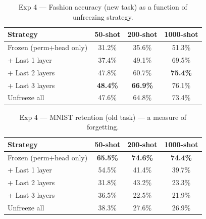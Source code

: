 \begin{table}[h!]
\centering
\caption{Exp 4 --- Fashion accuracy (new task) as a function of unfreezing strategy.}
\begin{tabular}{l c c c}
\hline
\textbf{Strategy} & \textbf{50-shot} & \textbf{200-shot} & \textbf{1000-shot} \\
\hline
Frozen (perm+head only) & 31.2\% & 35.6\% & 51.3\% \\
+ Last 1 layer & 37.4\% & 49.1\% & 69.5\% \\
+ Last 2 layers & 47.8\% & 60.7\% & \textbf{75.4\%} \\
+ Last 3 layers & \textbf{48.4\%} & \textbf{66.9\%} & 76.1\% \\
Unfreeze all & 47.6\% & 64.8\% & 73.4\% \\
\hline
\end{tabular}
\label{tab:cpu_exp4_fashion}
\end{table}

\begin{table}[h!]
\centering
\caption{Exp 4 --- MNIST retention (old task) --- a measure of forgetting.}
\begin{tabular}{l c c c}
\hline
\textbf{Strategy} & \textbf{50-shot} & \textbf{200-shot} & \textbf{1000-shot} \\
\hline
Frozen (perm+head only) & \textbf{65.5\%} & \textbf{74.6\%} & \textbf{74.4\%} \\
+ Last 1 layer & 54.5\% & 41.4\% & 39.7\% \\
+ Last 2 layers & 31.8\% & 43.2\% & 23.3\% \\
+ Last 3 layers & 36.5\% & 22.5\% & 21.9\% \\
Unfreeze all & 38.3\% & 27.6\% & 26.9\% \\
\hline
\end{tabular}
\label{tab:cpu_exp4_mnist}
\end{table}
